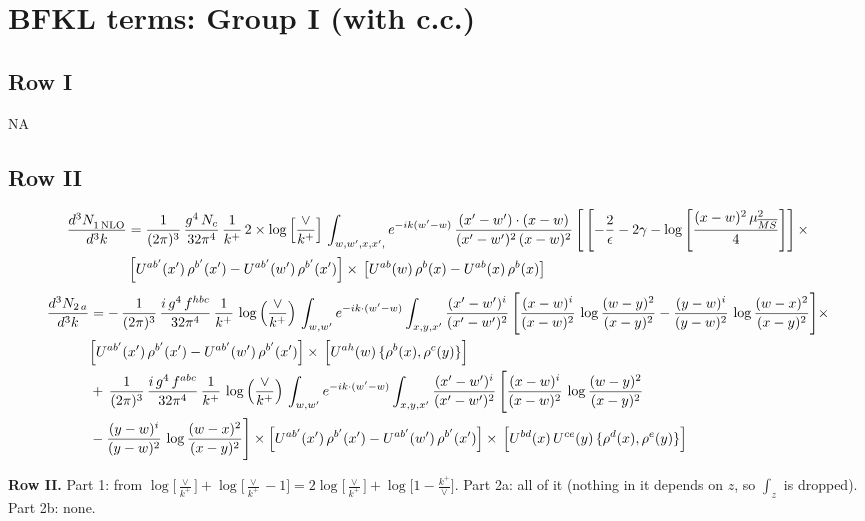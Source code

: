 \documentclass[9pt]{article}
\numberwithin{equation}{section}
\begin{document}
\section{BFKL terms: Group I (with c.c.)}
\subsection{Row I}
\textsc{NA}
\subsection{Row II}
\begin{align}
     \frac{d^{3}N_{1\,\rm NLO}^{\rm}}{d^{3}k} &  = \frac{1}{(2\pi)^{3}}\, \frac{g^{4}\,N_{c}}{32\pi^{4}}\,\frac{1}{k^{+}}\,2\times\log{\left[\frac{\vee}{k^{+}}\right]}\, \int_{w, w',x,x',} e^{-ik(w^\prime-w)}\, \frac{(x'-w')\cdot (x-w)}{(x'-w')^{2}\, (x-w)^{2}}\, \Bigg[\left[-\frac{2}{\epsilon}-2\gamma-\log{\left[\frac{(x-w)^{2}\,\mu^{2}_{\overline{MS}}}{4}\right]}\right]\times\notag \\ &  \left[U^{ab'}(x')\,\rho^{b'}(x') - U^{ab'}(w')\,\rho^{b'}(x')\right]\times\,\left[U^{ab}(w)\,\rho^{b}(x) - U^{ab}(x)\,\rho^{b}(x)\right]
\end{align}
\begin{align}
    \frac{d^{3}N_{2\,a}}{d^{3}k} & =  -\,\frac{1}{(2\pi)^{3}}\,\frac{i\,g^{4}\,f^{hbc}}{32\pi^{4}}\,\frac{1}{k^{+}}\,\log\left(\frac{\vee}{k^{+}}\right)\,
\int_{w,w'} e^{-ik\cdot(w'-w)}\int_{x,y,x'}\frac{(x'-w')^{i}}{(x'-w')^{2}}\,\Bigg[\frac{(x-w)^{i}}{(x-w)^{2}}\,\log\frac{(w-y)^{2}}{(x-y)^{2}}-\frac{(y-w)^{i}}{(y-w)^{2}}\,\log\frac{(w-x)^{2}}{(x-y)^{2}}\Bigg]\times\notag \\ & \Big[U^{ab'}(x')\,\rho^{b'}(x')-U^{ab'}(w')\,\rho^{b'}(x')\Big]\times\, \Big[U^{ah}(w)\,\{\rho^{b}(x),\rho^{c}(y)\}\Big]\notag \\ & +\,\frac{1}{(2\pi)^{3}}\,\frac{i\,g^{4}\,f^{abc}}{32\pi^{4}}\,\frac{1}{k^{+}}\, \log\left(\frac{\vee}{k^{+}}\right)\,
\int_{w,w'} e^{-ik\cdot(w'-w)}\int_{x,y,x'}\frac{(x'-w')^{i}}{(x'-w')^{2}}\,\Bigg[\frac{(x-w)^{i}}{(x-w)^{2}}\,\log\frac{(w-y)^{2}}{(x-y)^{2}}\notag \\ & -\frac{(y-w)^{i}}{(y-w)^{2}}\,\log\frac{(w-x)^{2}}{(x-y)^{2}}\Bigg]\times \Big[U^{ab'}(x')\,\rho^{b'}(x')-U^{ab'}(w')\,\rho^{b'}(x')\Big]\times\, \Big[U^{bd}(x)\,U^{ce}(y)\,\{\rho^{d}(x),\rho^{e}(y)\}\Big]
\end{align}

\textbf{Row II.} Part 1: from $\log\big[\frac{\vee}{k^+}\big]+\log\big[\frac{\vee}{k^+}-1\big]=2\log\big[\frac{\vee}{k^+}\big]+\log\big[1-\frac{k^+}{\vee}\big]$. Part 2a: all of it (nothing in it depends on $z$, so $\int_z$ is dropped). Part 2b: none.
\end{document}
